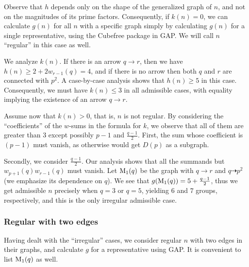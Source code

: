 Observe that $h$ depends only on the shape of the generalized graph of $n$, and not on the magnitudes of its prime factors.
Consequently, if $k(n) = 0$, we can calculate $g(n)$ for all $n$ with a specific graph simply by calculating $g(n)$ for a single representative,
using the Cubefree package in GAP{\cite{GAP4, cubefreepkg}}.
We will call $n$ ``regular'' in this case as well.

We analyze $k(n)$.
If there is an arrow $q \rightarrow r$, then we have $h(n) \ge 2 + 2w_{r - 1}(q) = 4$, and if there is no arrow then both $q$ and $r$ are connected with $p^2$.
A case-by-case analysis shows that $h(n) \ge 5$ in this case.
Consequently, we must have $k(n) \le 3$ in all admissible cases, with equality implying the existence of an arrow $q \rightarrow r$.

Assume now that $k(n) > 0$, that is, $n$ is not regular.
By considering the ``coefficients'' of the $w$-sums in the formula for $k$, we observe that all of them are greater than $3$ except possibly $p - 1$ and $\frac{q - 1}{2}$.
First, the sum whose coefficient is $(p - 1)$ must vanish, as otherwise would get $D(p)$ as a subgraph.

Secondly, we consider $\frac{q - 1}{2}$.
Our analysis shows that all the summands but $w_{p + 1}(q)w_{r - 1}(q)$ must vanish.
Let $\text{M}_{1}(q)$ be the graph with $q \rightarrow r$ and $q \dashrightarrow p^2$ (we emphasize its dependence on $q$).
We see that $g(\text{M}_{1}(q)) = 5 + \frac{q - 1}{2}$, thus we get admissible $n$ precisely when $q = 3$ or $q = 5$, yielding $6$ and $7$ groups,
respectively, and this is the only irregular admissible case.

\subsubsection*{Regular  with two edges}
Having dealt with the ``irregular'' cases, we consider regular $n$ with two edges in their graphs, and calculate $g$ for a representative using GAP.
It is convenient to list $\text{M}_{1}(q)$ as well.
\vspace*{-\baselineskip}


